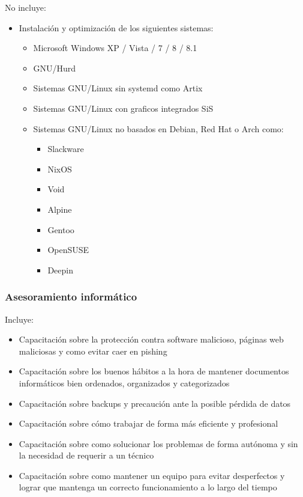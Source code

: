 \documentclass{article}
\begin{document}
			No incluye:
			\begin{itemize}
			\item Instalación y optimización de los siguientes sistemas:
				\begin{itemize}
				\item Microsoft Windows XP / Vista / 7 / 8 / 8.1
				\item GNU/Hurd
				\item Sistemas GNU/Linux sin systemd como Artix
				\item Sistemas GNU/Linux con graficos integrados SiS
				\item Sistemas GNU/Linux no basados en Debian, Red Hat o Arch como:
					\begin{itemize}
					\item Slackware
					\item NixOS
					\item Void
					\item Alpine
					\item Gentoo
					\item OpenSUSE
					\item Deepin
					\end{itemize}
				\end{itemize}
			\end{itemize}
		
		\subsubsection{Asesoramiento informático}
			Incluye:
			\begin{itemize}
			\item Capacitación sobre la protección contra software 
			malicioso, páginas web maliciosas y como evitar caer en pishing
			\item Capacitación sobre los buenos hábitos a la hora
			de mantener documentos informáticos bien ordenados, 
			organizados y categorizados
			\item Capacitación sobre backups y precaución
			ante la posible pérdida de datos
			\item Capacitación sobre cómo trabajar de forma
			más eficiente y profesional
			\item Capacitación sobre como solucionar los problemas
			de forma autónoma y sin la necesidad de requerir a un técnico
			\item Capacitación sobre como mantener un equipo para evitar
			desperfectos y lograr que mantenga un correcto funcionamiento
			a lo largo del tiempo
			\end{itemize}
			
\end{document}
